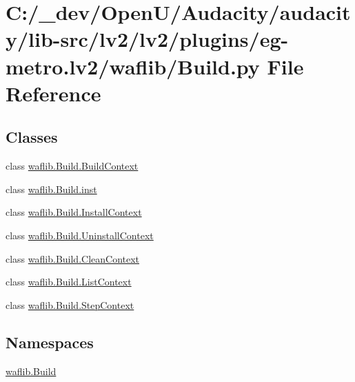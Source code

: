 \hypertarget{lv2_2plugins_2eg-metro_8lv2_2waflib_2_build_8py}{}\section{C\+:/\+\_\+dev/\+Open\+U/\+Audacity/audacity/lib-\/src/lv2/lv2/plugins/eg-\/metro.lv2/waflib/\+Build.py File Reference}
\label{lv2_2plugins_2eg-metro_8lv2_2waflib_2_build_8py}
\subsection*{Classes}
\begin{DoxyCompactItemize}
\item 
class \hyperlink{classwaflib_1_1_build_1_1_build_context}{waflib.\+Build.\+Build\+Context}
\item 
class \hyperlink{classwaflib_1_1_build_1_1inst}{waflib.\+Build.\+inst}
\item 
class \hyperlink{classwaflib_1_1_build_1_1_install_context}{waflib.\+Build.\+Install\+Context}
\item 
class \hyperlink{classwaflib_1_1_build_1_1_uninstall_context}{waflib.\+Build.\+Uninstall\+Context}
\item 
class \hyperlink{classwaflib_1_1_build_1_1_clean_context}{waflib.\+Build.\+Clean\+Context}
\item 
class \hyperlink{classwaflib_1_1_build_1_1_list_context}{waflib.\+Build.\+List\+Context}
\item 
class \hyperlink{classwaflib_1_1_build_1_1_step_context}{waflib.\+Build.\+Step\+Context}
\end{DoxyCompactItemize}
\subsection*{Namespaces}
\begin{DoxyCompactItemize}
\item 
 \hyperlink{namespacewaflib_1_1_build}{waflib.\+Build}
\end{DoxyCompactItemize}
